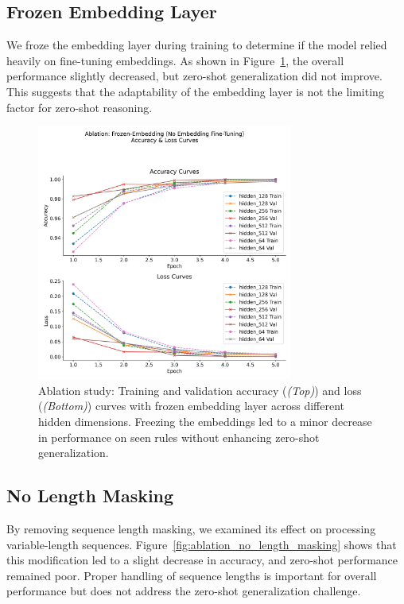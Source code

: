 \documentclass{article} %
\newcommand{\figtop}{{\em (Top)\/}}
\newcommand{\figbottom}{{\em (Bottom)\/}}
\theoremstyle{plain}
\begin{document}
\subsection{Frozen Embedding Layer}

We froze the embedding layer during training to determine if the model relied heavily on fine-tuning embeddings. As shown in Figure~\ref{fig:ablation_frozen_embedding}, the overall performance slightly decreased, but zero-shot generalization did not improve. This suggests that the adaptability of the embedding layer is not the limiting factor for zero-shot reasoning.

\begin{figure}[h!]
\centering
\includegraphics[width=0.75\textwidth]{Ablation_FrozenEmbedding_Curves.png}
\caption{Ablation study: Training and validation accuracy (\figtop) and loss (\figbottom) curves with frozen embedding layer across different hidden dimensions. Freezing the embeddings led to a minor decrease in performance on seen rules without enhancing zero-shot generalization.}
\label{fig:ablation_frozen_embedding}
\end{figure}

\subsection{No Length Masking}

By removing sequence length masking, we examined its effect on processing variable-length sequences. Figure~\ref{fig:ablation_no_length_masking} shows that this modification led to a slight decrease in accuracy, and zero-shot performance remained poor. Proper handling of sequence lengths is important for overall performance but does not address the zero-shot generalization challenge.
\end{document}
